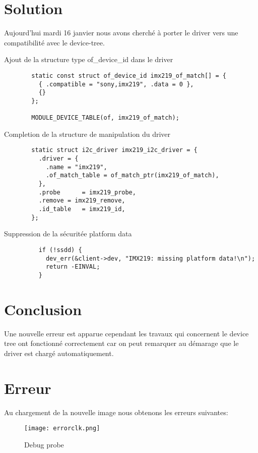 \section{Solution}
Aujourd'hui mardi 16 janvier nous avons cherché à porter le driver vers
une compatibilité avec le device-tree.
\begin{description}
  \item[Ajout de la structure type of\_device\_id dans le driver]
  \begin{lstlisting}
  static const struct of_device_id imx219_of_match[] = {
    { .compatible = "sony,imx219", .data = 0 },
    {}
  };

  MODULE_DEVICE_TABLE(of, imx219_of_match);
  \end{lstlisting}

  \item[Completion de la structure de manipulation du driver]
  \begin{lstlisting}
  static struct i2c_driver imx219_i2c_driver = {
    .driver = {
      .name = "imx219",
      .of_match_table = of_match_ptr(imx219_of_match),
    },
    .probe		= imx219_probe,
    .remove	= imx219_remove,
    .id_table	= imx219_id,
  };
  \end{lstlisting}

  \item[Suppression de la sécuritée platform data]
  \begin{lstlisting}
    if (!ssdd) {
      dev_err(&client->dev, "IMX219: missing platform data!\n");
      return -EINVAL;
    }
    \end{lstlisting}
\end{description}

\section{Conclusion}
Une nouvelle erreur est apparue cependant les travaux qui concernent le
device tree ont fonctionné correctement car on peut remarquer au démarage
que le driver est chargé automatiquement.

\section{Erreur}
Au chargement de la nouvelle image nous obtenons les erreurs suivantes:

\begin{figure}[th]
  \centering
  \texttt{[image: errorclk.png]}
  \decoRule
  \caption{Debug probe}  \label{fig:planning}
\end{figure}

